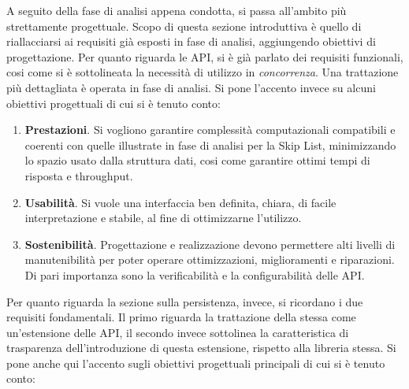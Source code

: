 
%

	A seguito della fase di analisi appena condotta, si passa all'ambito più strettamente progettuale. Scopo di questa sezione introduttiva è quello di riallacciarsi ai requisiti già esposti in fase di analisi, aggiungendo obiettivi di progettazione. Per quanto riguarda le API, si è già parlato dei requisiti funzionali, cosi come si è sottolineata la necessità di utilizzo in \textit{concorrenza}. Una trattazione più dettagliata è operata in fase di analisi. Si pone l'accento invece su alcuni obiettivi progettuali di cui si è tenuto conto:
	
	\begin{enumerate}
		\item \textbf{Prestazioni}. Si vogliono garantire complessità computazionali compatibili e coerenti con quelle illustrate in fase di analisi per la Skip List, minimizzando lo spazio usato dalla struttura dati, cosi come garantire ottimi tempi di risposta e throughput.
	  	\item \textbf{Usabilità}. Si vuole una interfaccia ben definita, chiara, di facile interpretazione e stabile, al fine di ottimizzarne l'utilizzo.
	  	\item \textbf{Sostenibilità}. Progettazione e realizzazione devono permettere alti livelli di manutenibilità per poter operare ottimizzazioni, miglioramenti e riparazioni. Di pari importanza sono la verificabilità e la configurabilità delle API.
	\end{enumerate}
	 
	Per quanto riguarda la sezione sulla persistenza, invece, si ricordano i due requisiti fondamentali. Il primo riguarda la trattazione della stessa come un'estensione delle API, il secondo invece sottolinea la caratteristica di trasparenza dell'introduzione di questa estensione, rispetto alla libreria stessa.
	Si pone anche qui l'accento sugli obiettivi progettuali principali di cui si è tenuto conto:
	
